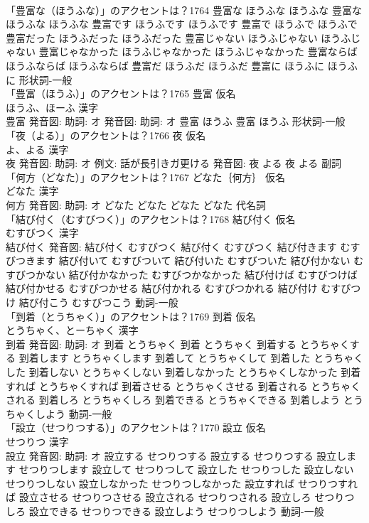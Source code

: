 \documentclass[8pt]{extreport}
\begin{document}
\begin{CJK}{UTF8}{min}
\\	「豊富な（ほうふな）」のアクセントは？1764		豊富な ほうふな ほうふな		豊富な ほうふな ほうふな 豊富です ほうふです ほうふです 豊富で ほうふで ほうふで 豊富だった ほうふだった ほうふだった 豊富じゃない ほうふじゃない ほうふじゃない 豊富じゃなかった ほうふじゃなかった ほうふじゃなかった 豊富ならば ほうふならば ほうふならば 豊富だ ほうふだ ほうふだ 豊富に ほうふに ほうふに				形状詞-一般 
\\	「豊富（ほうふ）」のアクセントは？1765	豊富 仮名　
\\	ほうふ、ほーふ 漢字　
\\	豊富 発音図: 助詞: オ 発音図: 助詞: オ	豊富 ほうふ		豊富 ほうふ				形状詞-一般 
\\	「夜（よる）」のアクセントは？1766	夜 仮名　
\\	よ、よる 漢字　
\\	夜 発音図: 助詞: オ 例文: 話が長引きガ更ける 発音図:	夜 よる		夜 よる				副詞 
\\	「何方（どなた）」のアクセントは？1767	どなた｛何方｝ 仮名　
\\	どなた 漢字　
\\	何方 発音図: 助詞: オ	どなた どなた		どなた どなた				代名詞 
\\	「結び付く（むすびつく）」のアクセントは？1768	結び付く 仮名　
\\	むすびつく 漢字　
\\	結び付く 発音図:	結び付く むすびつく		結び付く むすびつく 結び付きます むすびつきます 結び付いて むすびついて 結び付いた むすびついた 結び付かない むすびつかない 結び付かなかった むすびつかなかった 結び付けば むすびつけば 結び付かせる むすびつかせる 結び付かれる むすびつかれる 結び付け むすびつけ 結び付こう むすびつこう				動詞-一般 
\\	「到着（とうちゃく）」のアクセントは？1769	到着 仮名　
\\	とうちゃく、とーちゃく 漢字　
\\	到着 発音図: 助詞: オ	到着 とうちゃく		到着 とうちゃく 到着する とうちゃくする 到着します とうちゃくします 到着して とうちゃくして 到着した とうちゃくした 到着しない とうちゃくしない 到着しなかった とうちゃくしなかった 到着すれば とうちゃくすれば 到着させる とうちゃくさせる 到着される とうちゃくされる 到着しろ とうちゃくしろ 到着できる とうちゃくできる 到着しよう とうちゃくしよう				動詞-一般 
\\	「設立（せつりつする）」のアクセントは？1770	設立 仮名　
\\	せつりつ 漢字　
\\	設立 発音図: 助詞: オ	設立する せつりつする		設立する せつりつする 設立します せつりつします 設立して せつりつして 設立した せつりつした 設立しない せつりつしない 設立しなかった せつりつしなかった 設立すれば せつりつすれば 設立させる せつりつさせる 設立される せつりつされる 設立しろ せつりつしろ 設立できる せつりつできる 設立しよう せつりつしよう				動詞-一般 

\end{CJK}
\end{document}
